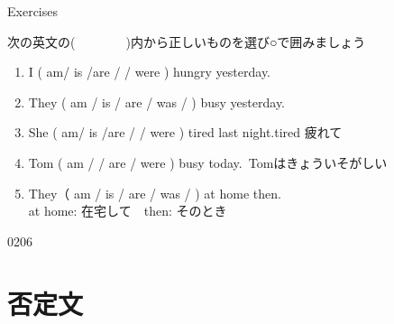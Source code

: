 \documentclass[aspectratio=169,xcolor={dvipsnames,table}]{beamer}
\newcommand{\myaudio}[1]{\href{#1}{\faVolumeUp}}
\begin{document}
\begin{frame}[plain]{Exercises}
 
次の英文の(~~~~~~~~)内から正しいものを選び○で囲みましょう

\begin{enumerate}
 \item I ( am/ is /are /  / were ) hungry yesterday.
 \item They ( am / is / are / was /  ) busy yesterday.
 \item She  ( am/ is /are /  / were ) tired last night.\hfill{}{\scriptsize tired  疲れて}
 \item Tom ( am /  / are / were ) busy today.\,\,\,{\scriptsize Tomはきょういそがしい}
 \item They（ am / is / are / was /  ) at home then.\\
       \mbox{}\hfill{}{\scriptsize at home: 在宅して　then: そのとき}
\end{enumerate}

\hfill{\tiny 0206}{\scriptsize \myaudio{./audio/024_past_be_03.mp3}}

\end{frame}

\section{否定文}
\end{document}
